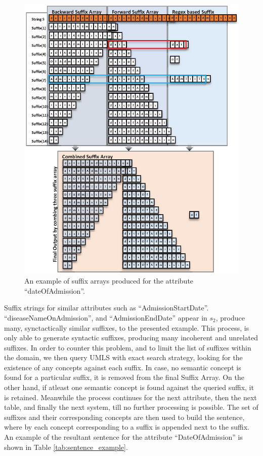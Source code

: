 \documentclass{ieeeaccess}
\begin{document}
\begin{figure}[tb!]
	\centering
	\includegraphics[scale=0.65]{suffixAttribute}
	\caption{An example of suffix arrays produced for the attribute ``dateOfAdmission''.}
	\label{fig:suffix_attribute}
\end{figure}


Suffix strings for similar attributes such as ``AdmissionStartDate''. ``diseaseNameOnAdmission'', and ``AdmissionEndDate'' appear in $s_2$, produce many, synctactically similar suffixes, to the presented example. This process, is only able to generate syntactic suffixes, producing many incoherent and unrelated suffixes. In order to counter this problem, and to limit the list of suffixes within the domain, we then query UMLS with exact search strategy, looking for the existence of any concepts against each suffix. In case, no semantic concept is found for a particular suffix, it is removed from the final Suffix Array. On the other hand, if atleast one semantic concept is found against the queried suffix, it is retained. Meanwhile the process continues for the next attribute, then the next table, and finally the next system, till no further processing is possible. 
The set of suffixes and their corresponding concepts are then used to build the sentence, where by each concept corresponding to a suffix is appended next to the suffix. An example of the resultant sentence for the attribute ``DateOfAdmission'' is shown in Table \ref{tab:sentence_example}.
\end{document}
